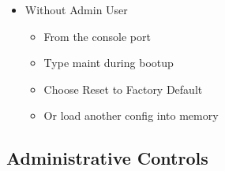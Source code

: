 \begin{itemize}
\begin{itemize}
\begin{itemize}
                    \end{itemize}
                \item Without Admin User
                    \begin{itemize}
                        \item From the console port
                        \item Type maint during bootup
                        \item Choose Reset to Factory Default
                        \item Or load another config into memory
                    \end{itemize}
            \end{itemize}
    \end{itemize}
    
\subsection{Administrative Controls}
